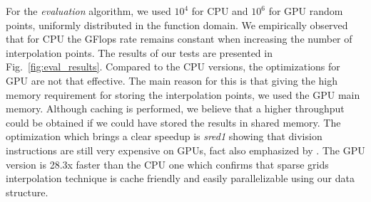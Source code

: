 For the \textit{evaluation} algorithm, we used $10^{4}$ for CPU and $10^{6}$
for GPU random points, uniformly distributed in the function domain. We
empirically observed that for CPU the GFlops rate remains constant when
increasing the number of interpolation points. The results of our tests are
presented in Fig.~\ref{fig:eval_results}. Compared to the CPU versions, the
optimizations for GPU are not that effective. The main reason for this is that
giving the high memory requirement for storing the interpolation points, we used
the GPU main memory. Although caching is performed, we believe that a higher
throughput could be obtained if we could have stored the results in shared
memory. The optimization which brings a clear speedup is \textit{sred1} showing
that division instructions are still very expensive on GPUs, fact also
emphasized by \cite{cuda}. The GPU version is 28.3x faster than the CPU
one which confirms that sparse grids interpolation technique is cache friendly
and easily parallelizable using our data structure.
